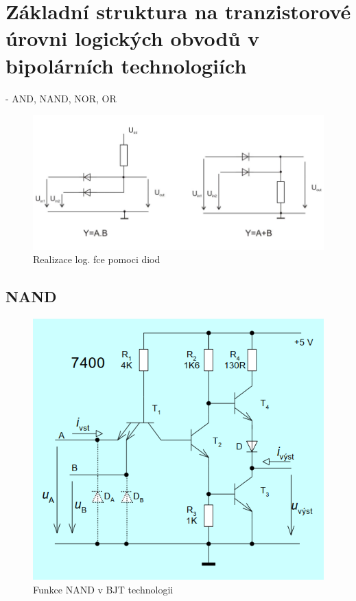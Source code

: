\section{Základní struktura na tranzistorové úrovni logických obvodů v bipolárních technologiích}
- AND, NAND, NOR, OR

   \begin{figure}[h]
   \begin{center}
     \includegraphics[scale=0.6]{images/dioda.png}
   \end{center}
   \caption{Realizace log. fce pomoci diod}
  \end{figure}
  
\subsection{NAND}
   \begin{figure}[h]
   \begin{center}
     \includegraphics[scale=0.6]{images/NANDBJT.png}
   \end{center}
   \caption{Funkce NAND v BJT technologii}
  \end{figure}
  
